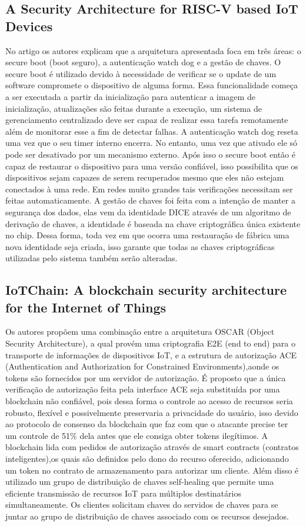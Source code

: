 \documentclass[article,12pt]{abntex2}
\begin{document}
\subsection{A Security Architecture for RISC-V based IoT Devices}%
No artigo os autores explicam que a arquitetura apresentada foca em três áreas: o secure boot (boot seguro), a autenticação watch dog e a gestão de chaves. O secure boot é utilizado devido à necessidade de verificar se o update de um software compromete o dispositivo de alguma forma. Essa funcionalidade começa a ser executada a partir da inicialização para autenticar a imagem de inicialização, atualizações são feitas durante a execução, um sistema de gerenciamento centralizado deve ser capaz de realizar essa tarefa remotamente além de monitorar esse a fim de detectar falhas. A autenticação watch dog reseta uma vez que o seu timer interno encerra. No entanto, uma vez que ativado ele só pode ser desativado por um mecanismo externo. Após isso o secure boot então é capaz de restaurar o dispositivo para uma versão confiável, isso possibilita que os dispositivos sejam capazes de serem recuperados mesmo que eles não estejam conectados à uma rede. Em redes muito grandes tais verificações necessitam ser feitas automaticamente. A gestão de chaves foi feita com a intenção de manter a segurança dos dados, elas vem da identidade DICE através de um algoritmo de derivação de chaves, a identidade é baseada na chave criptográfica única existente no chip. Dessa forma, toda vez em que ocorra uma restauração de fábrica uma nova identidade seja criada, isso garante que todas as chaves criptográficas utilizadas pelo sistema também serão alteradas.

\subsection{IoTChain: A blockchain security architecture for the Internet of Things}%
Os autores propõem  uma combinação entre a arquitetura OSCAR (Object Security Architecture), a qual provém uma criptografia E2E (end to end) para o transporte de informações de dispositivos IoT, e a estrutura de autorização ACE (Authentication and Authorization for Constrained Environments),aonde os tokens são fornecidos por um servidor de autorização. É proposto que a única verificação de autorização feita pela interface ACE seja substituída por uma blockchain não confiável, pois dessa forma o controle ao acesso de recursos seria robusto, flexível e possivelmente preservaria a privacidade do usuário, isso devido ao protocolo de consenso da blockchain que faz com que o atacante precise ter um controle de 51\% dela antes que ele consiga obter tokens ilegítimos. A blockchain lida com pedidos de autorização através de smart contracts (contratos inteligentes),os quais são definidos pelo dono do recurso oferecido, adicionando um token no contrato de armazenamento para autorizar um cliente. Além disso é utilizado um grupo de distribuição de chaves self-healing que permite uma eficiente transmissão de recursos IoT para múltiplos destinatários simultaneamente. Os clientes solicitam chaves do servidos de chaves para se juntar ao grupo de distribuição de chaves associado com os recursos desejados.
\end{document}
